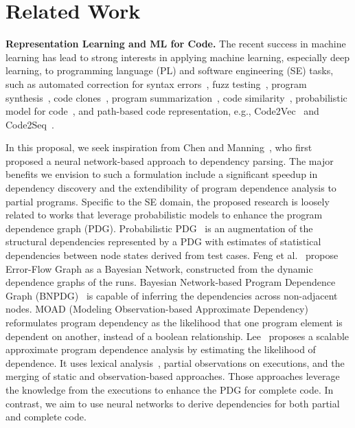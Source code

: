 \section{Related Work}
\textbf{Representation Learning and ML for Code.}  The recent success in
machine learning has lead to strong interests in applying machine
learning, especially deep learning, to programming language (PL) and
software engineering (SE) tasks, such as automated correction for
syntax errors~\cite{Bhatia-2016}, fuzz testing~\cite{Patra-2016},
program synthesis~\cite{Amodio-2017}, code
clones~\cite{White-2016,Smith-2009,Li-2017}, program
summarization~\cite{Allamanis-2016,Mou-2014}, code
similarity~\cite{Zhao-2018,Alon-2018}, probabilistic model for
code~\cite{Bielik-2016}, and path-based code representation,
e.g., Code2Vec~\cite{Alon-2018} and Code2Seq~\cite{alon2018code2seq}. 

In this proposal, we seek inspiration from Chen and Manning~\cite{chen-manning-2014-fast}, who first proposed a neural network-based approach to dependency parsing. The major benefits we envision to such a formulation include a significant speedup in dependency discovery and the extendibility of program dependence analysis to partial programs. 
Specific to the SE domain, 
the proposed research is loosely related to works that leverage probabilistic models to enhance the program dependence graph (PDG). Probabilistic PDG~\cite{baah-issta08-probabilistic} is an augmentation of the structural dependencies represented by a PDG with estimates of statistical dependencies between node states derived from test cases. Feng et al.~\cite{feng-paste10} propose Error-Flow Graph as a Bayesian Network, constructed from the dynamic dependence graphs of the runs. Bayesian Network-based Program Dependence Graph (BNPDG)~\cite{yu-jss17-bayesian} is capable of inferring the dependencies across non-adjacent nodes. MOAD (Modeling Observation-based Approximate Dependency)~\cite{lee-scam19-moad} reformulates program dependency as the likelihood that one program element is dependent on another, instead of a boolean relationship.  Lee~\cite{lee-icse20} proposes a scalable approximate program dependence analysis by estimating the likelihood of dependence. It uses lexical analysis~\cite{lee-jss20}, partial observations on executions, and the merging of static and observation-based approaches. Those approaches leverage the knowledge from the executions to enhance the PDG for complete code. In contrast, we aim to use neural networks to derive dependencies for both partial and complete code.


